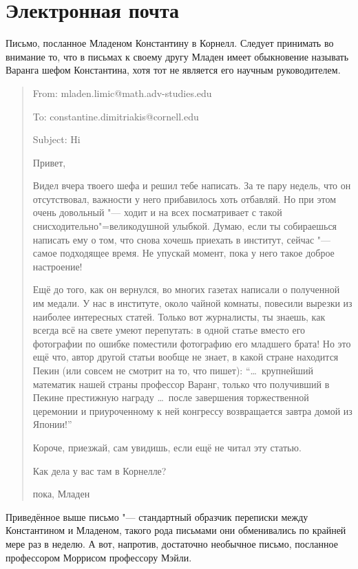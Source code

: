 \section{Электронная почта}

Письмо, посланное Младеном Константину в Корнелл.
Следует принимать во внимание то, что в письмах к своему другу Младен имеет
обыкновение называть Варанга шефом Константина, хотя тот не является его научным
руководителем.

\begin{quote}
From: mladen.limic@math.adv-studies.edu

To: constantine.dimitriakis@cornell.edu

Subject: Hi

\medskip
Привет,

Видел вчера твоего шефа и решил тебе написать.
За те пару недель, что он отсутствовал, важности у него прибавилось хоть
отбавляй.
Но при этом очень довольный "--- ходит и на всех посматривает с такой
снисходительно"=великодушной улыбкой.
Думаю, если ты собираешься написать ему о том, что снова хочешь приехать в
институт, сейчас "--- самое подходящее время.
Не упускай момент, пока у него такое доброе настроение!

Ещё до того, как он вернулся, во многих газетах написали о полученной им медали.
У нас в институте, около чайной комнаты, повесили вырезки из наиболее интересных
статей.
Только вот журналисты, ты знаешь, как всегда всё на свете умеют перепутать: в
одной статье вместо его фотографии по ошибке поместили фотографию его младшего
брата!
Но это ещё что, автор другой статьи вообще не знает, в какой стране находится
Пекин (или совсем не смотрит на то, что пишет):
\enquote{\ldots\ крупнейший математик нашей страны профессор Варанг, только что
получивший в Пекине престижную награду \ldots\ после завершения торжественной
церемонии и приуроченному к ней конгрессу возвращается завтра домой из Японии!}

Короче, приезжай, сам увидишь, если ещё не читал эту статью.

Как дела у вас там в Корнелле?

пока, Младен
\end{quote}

Приведённое выше письмо "--- стандартный образчик переписки между Константином и
Младеном, такого рода письмами они обменивались по крайней мере раз в неделю.
А вот, напротив, достаточно необычное письмо, посланное профессором Моррисом
профессору Мэйли.

